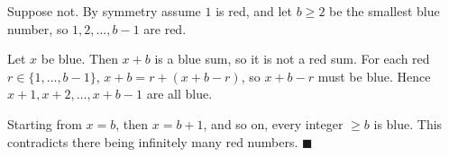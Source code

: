 Suppose not. By symmetry assume $1$ is red, and let $b\ge2$ be the smallest blue number, so $1,2,\dots,b-1$ are red.

Let $x$ be blue. Then $x+b$ is a blue sum, so it is not a red sum. For each red $r\in\{1,\dots,b-1\}$, $x+b=r+(x+b-r)$, so $x+b-r$ must be blue. Hence $x+1,x+2,\dots,x+b-1$ are all blue.

Starting from $x=b$, then $x=b+1$, and so on, every integer $\ge b$ is blue. This contradicts there being infinitely many red numbers. $\blacksquare$
